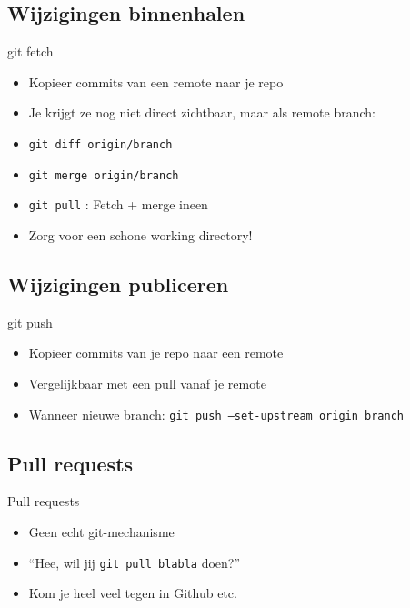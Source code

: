 \subsection{Wijzigingen binnenhalen}
\begin{frame}{git fetch}
	\begin{itemize}
		\item Kopieer commits van een remote naar je repo
		\item Je krijgt ze nog niet direct zichtbaar, maar als remote branch:
		\item \texttt{git diff origin/branch}
		\item \texttt{git merge origin/branch}
		\item \texttt{git pull} : Fetch + merge ineen
		\item Zorg voor een schone working directory!
	\end{itemize}
\end{frame}

\subsection{Wijzigingen publiceren}
\begin{frame}{git push}
	\begin{itemize}
		\item Kopieer commits van je repo naar een remote
		\item Vergelijkbaar met een pull vanaf je remote
		\item Wanneer nieuwe branch: \texttt{git push --set-upstream origin branch}
	\end{itemize}
\end{frame}

\subsection{Pull requests}
\begin{frame}{Pull requests}
	\begin{itemize}
		\item Geen echt git-mechanisme
		\item ``Hee, wil jij \texttt{git pull blabla} doen?''
		\item Kom je heel veel tegen in Github etc.
	\end{itemize}
\end{frame}

